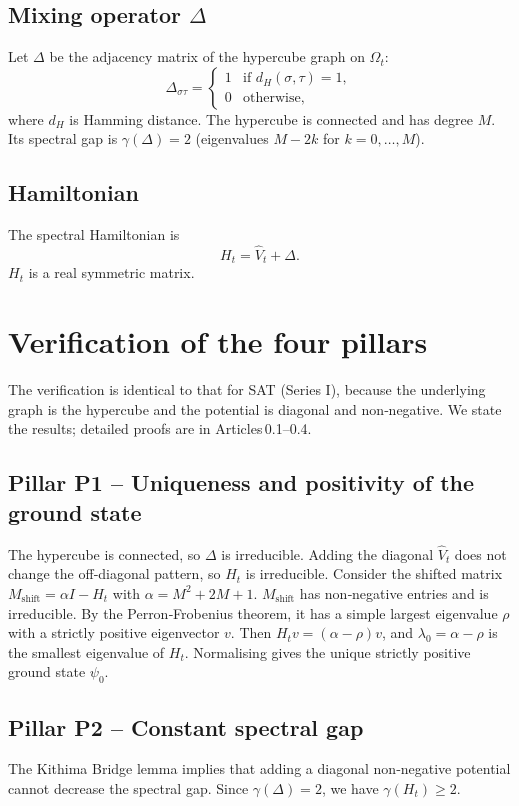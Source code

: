 \documentclass[11pt,a4paper]{article}
\begin{document}
\subsection{Mixing operator \(\Delta\)}
Let \(\Delta\) be the adjacency matrix of the hypercube graph on \(\Omega_t\):
\[
\Delta_{\sigma\tau} = \begin{cases}
1 & \text{if } d_H(\sigma,\tau)=1,\\
0 & \text{otherwise},
\end{cases}
\]
where \(d_H\) is Hamming distance. The hypercube is connected and has degree \(M\). Its spectral gap is \(\gamma(\Delta)=2\) (eigenvalues \(M-2k\) for \(k=0,\dots,M\)).

\subsection{Hamiltonian}
The spectral Hamiltonian is
\[
H_t = \hat{V}_t + \Delta.
\]
\(H_t\) is a real symmetric matrix.

\section{Verification of the four pillars}

The verification is identical to that for SAT (Series I), because the underlying graph is the hypercube and the potential is diagonal and non‑negative. We state the results; detailed proofs are in Articles 0.1–0.4.

\subsection{Pillar P1 – Uniqueness and positivity of the ground state}
The hypercube is connected, so \(\Delta\) is irreducible. Adding the diagonal \(\hat{V}_t\) does not change the off‑diagonal pattern, so \(H_t\) is irreducible. Consider the shifted matrix \(M_{\text{shift}} = \alpha I - H_t\) with \(\alpha = M^2 + 2M + 1\). \(M_{\text{shift}}\) has non‑negative entries and is irreducible. By the Perron‑Frobenius theorem, it has a simple largest eigenvalue \(\rho\) with a strictly positive eigenvector \(v\). Then \(H_t v = (\alpha-\rho)v\), and \(\lambda_0 = \alpha-\rho\) is the smallest eigenvalue of \(H_t\). Normalising gives the unique strictly positive ground state \(\psi_0\).

\subsection{Pillar P2 – Constant spectral gap}
The Kithima Bridge lemma implies that adding a diagonal non‑negative potential cannot decrease the spectral gap. Since \(\gamma(\Delta)=2\), we have \(\gamma(H_t) \ge 2\).
\end{document}
